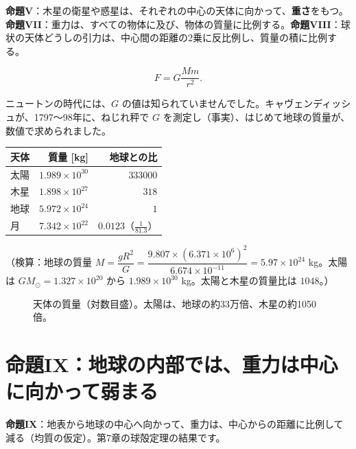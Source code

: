 \documentclass[a4paper,11pt,openany]{ltjsbook}
\begin{document}
\textbf{命題V}：木星の衛星や惑星は、それぞれの中心の天体に向かって、\textbf{重さ}をもつ。\textbf{命題VII}：重力は、すべての物体に及び、物体の質量に比例する。\textbf{命題VIII}：球状の天体どうしの引力は、中心間の距離の2乗に反比例し、質量の積に比例する。

\[
F=G\frac{Mm}{r^2}.
\]

ニュートンの時代には、$G$ の値は知られていませんでした。キャヴェンディッシュが、1797〜98年に、ねじれ秤で $G$ を測定し（事実）、はじめて地球の質量が、数値で求められました。

\begin{center}
\begin{tabular}{lrr}
\toprule
天体 & 質量 [kg] & 地球との比\\
\midrule
太陽 & $1.989\times10^{30}$ & $333000$\\
木星 & $1.898\times10^{27}$ & $318$\\
地球 & $5.972\times10^{24}$ & $1$\\
月 & $7.342\times10^{22}$ & $0.0123$（$\frac1{81.3}$）\\
\bottomrule
\end{tabular}
\end{center}

（検算：地球の質量 $M=\dfrac{gR^2}{G}=\dfrac{9.807\times(6.371\times10^6)^2}{6.674\times10^{-11}}=5.97\times10^{24}$ kg。太陽は $GM_\odot=1.327\times10^{20}$ から $1.989\times10^{30}$ kg。太陽と木星の質量比は $1048$。）

\begin{figure}[htbp]
\centering
{}
\caption{天体の質量（対数目盛）。太陽は、地球の約33万倍、木星の約1050倍。}
\end{figure}

\section{命題IX：地球の内部では、重力は中心に向かって弱まる}

\textbf{命題IX}：地表から地球の中心へ向かって、重力は、中心からの距離に比例して減る（均質の仮定）。第7章の球殻定理の結果です。
\end{document}
